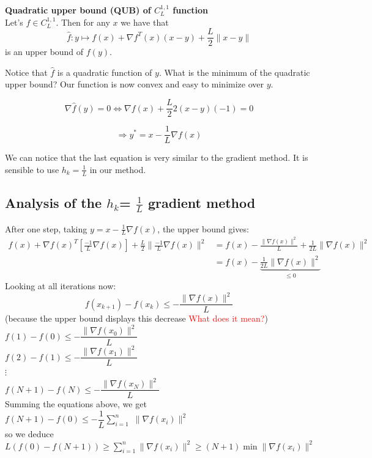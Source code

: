 \begin{lemma}
\textbf{Quadratic upper bound (QUB) of $C_L^{1,1}$ function} \\
Let's $f \in C_L^{1,1}$. Then for any $x$ we have that 
$$ \hat{f}: y \mapsto  f(x)+ \nabla f^T(x)(x-y)+ \frac{L}{2} \| x-y\| $$
 is an upper bound of $f(y)$.
\end{lemma}

Notice that $\hat{f}$ is a quadratic function of $y$.  What is the minimum of the quadratic upper bound? Our function is now convex and easy to minimize over $y$.


$$\nabla \hat{f}(y)=0 \Leftrightarrow  \nabla f(x) +\frac{L}{2} 2(x-y)(-1)=0$$

$$ \Rightarrow y^{*} = x- \frac{1}{L} \nabla f(x)$$

We can notice that the last equation is very similar to the gradient method. It is sensible to use $h_k=\frac{1}{L}$ in our method. 

\subsection{Analysis of the $h_{k}$= $\frac{1}{L}$ gradient method}
 
After one step, taking  $y= x-\frac{1}{L}\nabla f(x)$, the upper bound gives:
\begin{align*}
f(x) + \nabla f(x)^{T} [\frac{-1}{L} \nabla f(x)]+\frac{L}{2} \|  \frac{-1}{L}\nabla f(x)\|^2
& =f(x)- \frac{\|\nabla f(x)\|^{2}}{L}+\frac{1}{2L} \|\nabla f(x)\|^{2} \\
& =f(x)-\underbrace{\frac{1}{2L} \|\nabla f(x)\|^{2}}_{\leq 0}
\end{align*}
Looking at all iterations now:
$$ f(x_{k+1})-f(x_{k}) \leq - \frac{\|\nabla f(x)\|^{2}}{L}$$
(because the upper bound displays this decrease \textcolor{red}{What does it mean?})\\


$f(1)-f(0) \leq -\dfrac{\|\nabla f(x_{0})\|^{2}}{L}$\\
$f(2)-f(1) \leq -\dfrac{\|\nabla f(x_{1})\|^{2}}{L}$ \\
$\vdots$ \\
$f(N+1)-f(N) \leq -\dfrac{\|\nabla f(x_{N})\|^{2}}{L}$\\

Summing the equations above, we get \\
$f(N+1)-f(0) \leq - \dfrac{1}{L} \sum\limits_{i=1}^{n}$ $\|\nabla f(x_{i})\|^{2}$\\
so we deduce \\
$L(f(0)-f(N+1)) \geq \sum\limits_{i=1}^{n} \|\nabla f(x_{i})\|^{2} \geq (N+1) \min \|\nabla f(x_{i})\|^{2}$

